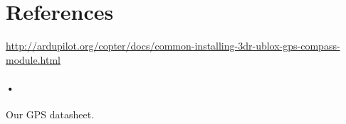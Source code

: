 \documentclass[11pt,a4paper]{article}
\begin{document}
	\section{References}
	\url{http://ardupilot.org/copter/docs/common-installing-3dr-ublox-gps-compass-module.html}
	\paragraph{•}
		 Our GPS datasheet.
\end{document}

